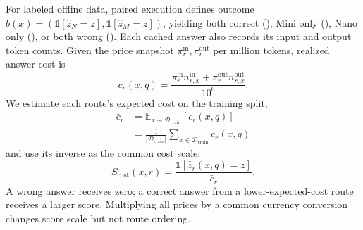 For labeled offline data, paired execution defines outcome
$b(x)=(\mathbb{1}[\hat z_N=z],\mathbb{1}[\hat z_M=z])$, yielding both correct
(\bc), Mini only (\mo), Nano only (\no), or both wrong (\bw). Each cached answer
also records its input and output token counts. Given the price snapshot
$\pi_r^{\mathrm{in}},\pi_r^{\mathrm{out}}$ per million tokens, realized answer
cost is
\begin{equation}
 c_r(x,q)=\frac{\pi_r^{\mathrm{in}}n_{r,x}^{\mathrm{in}}+
                    \pi_r^{\mathrm{out}}n_{r,x}^{\mathrm{out}}}{10^6}.
 \label{eq:realized-cost}
\end{equation}
We estimate each route's expected cost on the training split,
\begin{equation}
 \begin{aligned}
 \bar c_r&=\mathbb{E}_{x\sim\mathcal D_{\mathrm{train}}}[c_r(x,q)]\\
 &=\frac{1}{|\mathcal D_{\mathrm{train}}|}
   \sum_{x\in\mathcal D_{\mathrm{train}}}c_r(x,q)
 \end{aligned}
 \label{eq:expected-cost}
\end{equation}
and use its inverse as the common cost scale:
\begin{equation}
 S_{\mathrm{cost}}(x,r)=
 \frac{\mathbb{1}[\hat z_r(x,q)=z]}{\bar c_r}.
 \label{eq:cost-score}
\end{equation}
A wrong answer receives zero; a correct answer from a lower-expected-cost route
receives a larger score. Multiplying all prices by a common currency conversion
changes score scale but not route ordering.

